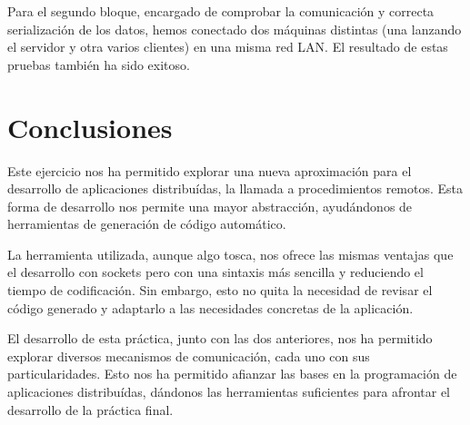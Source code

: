 \documentclass[]{article}
\begin{document}
Para el segundo bloque, encargado de comprobar la comunicación y correcta serialización de los datos, hemos conectado dos máquinas distintas (una lanzando el servidor y otra varios clientes) en una misma red LAN. El resultado de estas pruebas también ha sido exitoso.

\section{Conclusiones}
\label{sec:conclusiones}
Este ejercicio nos ha permitido explorar una nueva aproximación para el desarrollo de aplicaciones distribuídas, la llamada a procedimientos remotos. Esta forma de desarrollo nos permite una mayor abstracción, ayudándonos de herramientas de generación de código automático. 

La herramienta utilizada, aunque algo tosca, nos ofrece las mismas ventajas que el desarrollo con sockets pero con una sintaxis más sencilla y reduciendo el tiempo de codificación. Sin embargo, esto no quita la necesidad de revisar el código generado y adaptarlo a las necesidades concretas de la aplicación. 

El desarrollo de esta práctica, junto con las dos anteriores, nos ha permitido explorar diversos mecanismos de comunicación, cada uno con sus particularidades. Esto nos ha permitido afianzar las bases en la programación de aplicaciones distribuídas, dándonos las herramientas suficientes para afrontar el desarrollo de la práctica final. 
\end{document}
